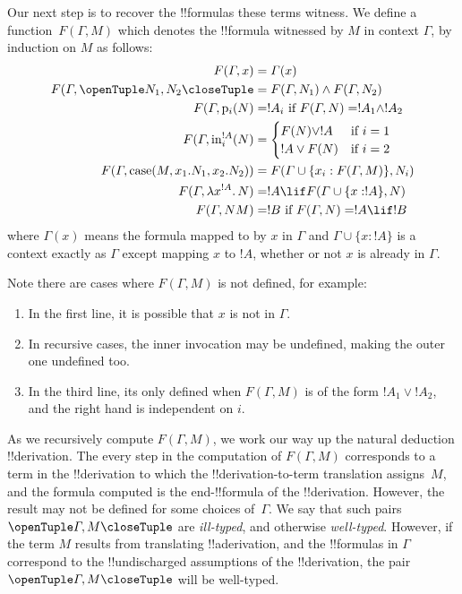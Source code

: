 \documentclass[../../../include/open-logic-section]{subfiles}
\begin{document}
Our next step is to recover the !!{formula}s these terms witness. We
define a function~$F(\Gamma,M)$ which denotes the !!{formula}
witnessed by $M$ in context $\Gamma$, by induction on $M$ as follows:
\begin{align*}
  F(\Gamma, x) &= \Gamma(x) \\
  F(\Gamma, \andi{N_1}{N_2} & = F(\Gamma, N_1) \land F(\Gamma, N_2)\\
  F(\Gamma, \ande{i}{N} & = !A_i \text{ if } F(\Gamma, N) = !A_1 \land !A_2\\
  F(\Gamma, \ori{i}{!A}{N} & = \begin{cases} F(N) \lor !A & \text{if } i = 1\\
    !A \lor F(N) & \text{if } i = 2\end{cases}\\
  F(\Gamma, \ore{M}{x_1}{N_1}{x_2}{N_2}) &= F(\Gamma \cup
  \{x_i:F(\Gamma, M)\}, N_i) \\
  F(\Gamma, \lambd[\typeof{x}{!A}][N]) &= !A \lif F(\Gamma \cup
  \{x:!A\}, N) \\
  F(\Gamma, NM) & = !B \text{ if } F(\Gamma, N) = !A \lif !B
\end{align*}
where $\Gamma(x)$ means the formula mapped to by $x$ in $\Gamma$
and $\Gamma \cup \{x:!A\}$
is a context exactly as $\Gamma$ except mapping $x$ to $!A$,
whether or not $x$ is already in $\Gamma$.

Note there are cases where $F(\Gamma, M)$ is not defined, for example:
\begin{enumerate}
\item In the first line, it is possible that $x$ is not in $\Gamma$.
\item In recursive cases, the inner invocation may be undefined, making
  the outer one undefined too.
\item In the third line, its only defined when $F(\Gamma, M)$ is of
  the form $!A_1 \lor !A_2$, and the right hand is independent on $i$.
\end{enumerate}

As we recursively compute $F(\Gamma, M)$, we work our way up the
natural deduction !!{derivation}. The every step in the computation of
$F(\Gamma, M)$ corresponds to a term in the !!{derivation} to which
the !!{derivation}-to-term translation assigns~$M$, and the formula
computed is the end-!!{formula} of the !!{derivation}. However, the result
may not be defined for some choices of~$\Gamma$. We say that such
pairs $\tuple{\Gamma, M}$ are \emph{ill-typed}, and otherwise
\emph{well-typed}. However, if the term $M$ results from translating
!!a{derivation}, and the !!{formula}s in $\Gamma$ correspond to the
!!{undischarged} assumptions of the !!{derivation}, the pair
$\tuple{\Gamma, M}$ will be well-typed.
\end{document}
